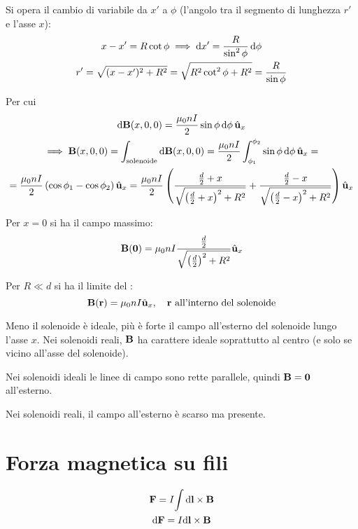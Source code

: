 Si opera il cambio di variabile da $x'$ a $\phi$ (l'angolo tra il segmento di lunghezza $r'$ e l'asse $x$):
\begin{gather}
    x - x' = R \cot\phi \implies \mathrm{d} x' = \frac{R}{\sin^2\phi} \, \mathrm{d} \phi \\
    r' = \sqrt{(x - x')^2 + R^2} = \sqrt{R^2 \cot^2\phi + R^2} = \frac{R}{\sin\phi}
\end{gather}

Per cui
\begin{gather}
    \mathrm{d}\mathbf{B}(x, 0, 0) = \frac{\mu_0 n I}{2} \sin\phi \, \mathrm{d} \phi \, \hat{\mathbf{u}}_{x} \\
\begin{gathered}
    \implies \mathbf{B}(x, 0, 0) = \int_\mathrm{solenoide} \mathrm{d}\mathbf{B}(x, 0, 0)
    = \frac{\mu_0 n I}{2} \int_{\phi_1}^{\phi_2} \sin\phi \, \mathrm{d} \phi \, \hat{\mathbf{u}}_{x} = \\
    = \frac{\mu_0 n I}{2} \left( \cos\phi_1 - \cos\phi_2 \right) \hat{\mathbf{u}}_{x}
    = \frac{\mu_0 n I}{2} \left( 
        \frac{\frac{d}{2} + x}{\sqrt{\left( \frac{d}{2}+x \right)^2 + R^2}}
        + \frac{\frac{d}{2} - x}{\sqrt{\left( \frac{d}{2}-x \right)^2 + R^2}}
     \right) \hat{\mathbf{u}}_{x}
\end{gathered}
\end{gather}

Per $x = 0$ si ha il campo massimo:
\begin{equation}
    \mathbf{B}(\mathbf{0}) = \mu_0 n I \frac{\frac{d}{2}}{\sqrt{\left( \frac{d}{2} \right)^2 + R^2}} \hat{\mathbf{u}}_{x}
\end{equation}

Per $R \ll d$ si ha il limite del :
\begin{equation}
    \mathbf{B}(\mathbf{r}) = \mu_0 n I \hat{\mathbf{u}}_{x}, \quad \text{$\mathbf{r}$ all'interno del solenoide}
\end{equation}

Meno il solenoide è ideale, più è forte il campo all'esterno del solenoide lungo l'asse $x$.
Nei solenoidi reali, $\mathbf{B}$ ha carattere ideale soprattutto al centro (e solo se vicino all'asse del solenoide).

Nei solenoidi ideali le linee di campo sono rette parallele, quindi $\mathbf{B} = \mathbf{0}$ all'esterno.

Nei solenoidi reali, il campo all'esterno è scarso ma presente.



\section{Forza magnetica su fili}

\begin{subequations}
\begin{gather}
    \mathbf{F} = I \!\int \mathrm{d} \mathbf{l} \times \mathbf{B} \\
    \mathrm{d} \mathbf{F} = I \mathrm{d} \mathbf{l} \times \mathbf{B}
\end{gather}
\end{subequations}

